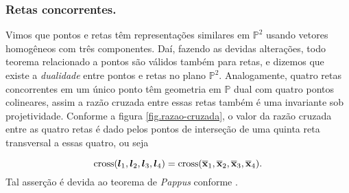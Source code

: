 %
%
%
%

\subsubsection*{Retas concorrentes.}
Vimos que pontos e retas têm representações similares em ${\mathbb{P}^2}$ usando vetores homogêneos com três componentes. Daí, fazendo as devidas alterações, todo teorema relacionado a pontos são válidos também para retas, e dizemos que existe a {\it dualidade} entre pontos e retas no plano ${\mathbb{P}^2}$. Analogamente,  
quatro retas concorrentes em um único ponto têm geometria em ${\mathbb{P}}$ dual com quatro pontos colineares, assim a razão cruzada entre essas retas também é uma invariante sob projetividade. Conforme a figura \ref{fig.razao-cruzada}, o valor da razão cruzada entre as quatro retas é dado pelos pontos de interseção de uma quinta reta transversal a essas quatro, ou seja

\begin{equation*}
\text{cross}(\boldsymbol{l}_1,\boldsymbol{l}_2,\boldsymbol{l}_3,\boldsymbol{l}_4)=\text{cross}(\overline{\mathbf{x}}_1,\overline{\mathbf{x}}_2,\overline{\mathbf{x}}_3,\overline{\mathbf{x}}_4).
\end{equation*}
Tal asserção é devida ao teorema de \textit{Pappus} conforme \citep{springer64}. 



